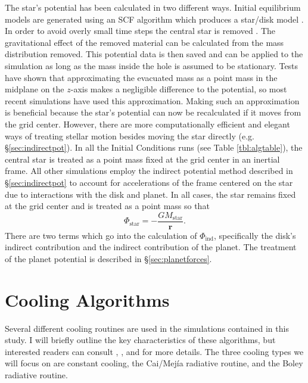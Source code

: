 The star's potential has been calculated in two different ways. Initial equilibrium models are generated using an SCF algorithm which produces a star/disk model \citep{pickettphd1995}. In order to avoid overly small time steps the central star is removed \citep{pickett2003}. The gravitational effect of the removed material can be calculated from the mass distribution removed. This potential data is then saved and can be applied to the simulation as long as the mass inside the hole is assumed to be stationary. Tests have shown that approximating the evacuated mass as a point mass in the midplane on the $z$-axis makes a negligible difference to the potential, so most recent simulations have used this approximation. Making such an approximation is beneficial because the star's potential can now be recalculated if it moves from the grid center. However, there are more computationally efficient and elegant ways of treating stellar motion besides moving the star directly (e.g. \S\ref{sec:indirectpot}). In all the Initial Conditions runs (see Table \ref{tbl:algtable}), the central star is treated as a point mass fixed at the grid center in an inertial frame. All other simulations employ the indirect potential method described in \S\ref{sec:indirectpot} to account for accelerations of the frame centered on the star due to interactions with the disk and planet. In all cases, the star remains fixed at the grid center and is treated as a point mass so that 
\begin{equation}
\Phi_{\mathrm{star}} = -\frac{GM_{\mathrm{star}}}{\boldsymbol{r}}. \label{eq:starpot}
\end{equation}
There are two terms which go into the calculation of $\Phi_{\mathrm{ind}}$, specifically the disk's indirect contribution and the indirect contribution of the planet. The treatment of the planet potential is described in \S\ref{sec:planetforces}.  

\section{Cooling Algorithms} \label{sec:cooling}

Several different cooling routines are used in the simulations contained in this study. I will briefly outline the key characteristics of these algorithms, but interested readers can consult \citet{mejiaphd2004}, \citet{caiphd2006}, and \citet{boleyphd2007} for more details. The three cooling types we will focus on are constant cooling, the Cai/Mej\'{i}a radiative routine, and the Boley radiative routine. 

